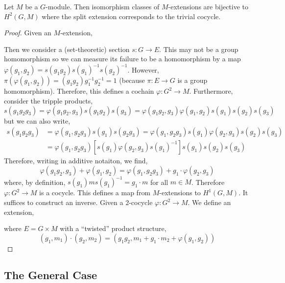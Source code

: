 \documentclass[12pt]{article}
\begin{document}
\begin{prop}
Let $M$ be a $G$-module. Then isomorphism classes of $M$-extensions are bijective to $H^2(G, M)$ where the split extension corresponds to the trivial cocycle.
\end{prop}

\begin{proof}
Given an $M$-extension,
\begin{center}
\end{center}
Then we consider a (set-theoretic) section $s : G \to E$. This may not be a group homomorphism so we can measure its failure to be a homomorphism by a map $\varphi(g_1, g_2) = s(g_1 g_2) s(g_1)^{-1} s(g_2)^{-1}$. However, $\pi(\varphi(g_1, g_2)) = (g_1 g_2) g_1^{-1} g_2^{-1} = 1$ (because $\pi : E \to G$ is a group homomorphism). Therefore, this defines a cochain $\varphi : G^2 \to M$. Furthermore, consider the tripple products,
\[ s(g_1 g_2 g_3) = \varphi(g_1 g_2, g_3) s(g_1 g_2) s(g_3) = \varphi(g_1 g_2, g_3) \varphi(g_1, g_2) s(g_1) s(g_2) s(g_3) \]
but we can also write,
\begin{align*}
s(g_1 g_2 g_3) & = \varphi(g_1, g_2 g_3) s(g_1) s(g_2 g_3) = \varphi(g_1, g_2 g_3) s(g_1) \varphi(g_2, g_3) s(g_2) s(g_3) 
\\
& = \varphi(g_1, g_2 g_3) [ s(g_1) \varphi(g_2, g_3) s(g_1)^{-1} ] s(g_1) s(g_2) s(g_3)
\end{align*}
Therefore, writing in additive notaiton, we find,
\[ \varphi(g_1 g_2, g_3) + \varphi(g_1, g_2) = \varphi(g_1, g_2 g_3) + g_1 \cdot \varphi(g_2, g_3) \]
where, by definition, $s(g_1) m s(g_1)^{-1} = g_1 \cdot m$ for all $m \in M$. Therefore $\varphi : G^2 \to M$ is a cocycle. This defines a map from $M$-extensions to $H^1(G, M)$. It suffices to construct an inverse. Given a $2$-cocycle $\varphi : G^2 \to M$. We define an extension,
\begin{center}
\end{center}
where $E = G \times M$ with a ``twisted'' product structure,
\[ (g_1, m_1) \cdot (g_2, m_2) = (g_1 g_2, m_1 + g_1 \cdot m_2 + \varphi(g_1, g_2)) \]
\end{proof}

\subsection{The General Case}
\end{document}
